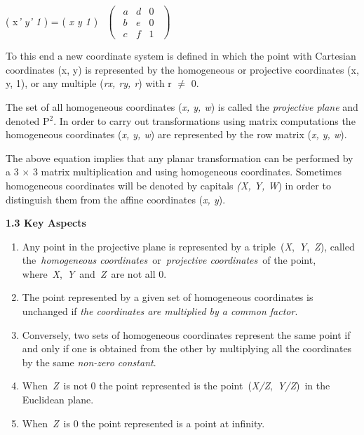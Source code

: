 \documentclass{article} %
\begin{document}
    ( x\textit{'  y'  1 })    =    ( \textit{x  y  1} )$\ \ \ \ \left( \begin{array}{ccc}
\ \ a & d & 0\ \  \\ 
\ \ b & e & 0\ \  \\ 
\ \ c & f & 1\ \  \end{array}
\right)$

\noindent 

\noindent To this end a new coordinate system is defined in which the point with Cartesian coordinates (x, y) is represented by the homogeneous or projective coordinates (x, y, 1), or any multiple (\textit{rx, ry, r}) with r $\mathrm{\neq}$ 0.

\noindent The set of all homogeneous coordinates (\textit{x, y, w}) is called the \textit{projective plane} and denoted P${}^{2}$. In order to carry out transformations using matrix computations the homogeneous coordinates (\textit{x, y, w}) are represented by the row matrix (\textit{x, y, w}). 

The above equation implies that any planar transformation can be performed by a 3 $\times$ 3 matrix multiplication and using homogeneous coordinates. Sometimes homogeneous coordinates will be denoted by capitals \textit{(X, Y, W}) in order to distinguish them from the affine coordinates (\textit{x, y}).



\noindent \textbf{1.3 Key Aspects}

\begin{enumerate}
\item \textbf{ }Any point in the projective plane is represented by a triple~(\textit{X},~\textit{Y},~\textit{Z}), called the~\textit{homogeneous coordinates}~or~\textit{projective coordinates}~of the point, where~\textit{X},~\textit{Y}~and~\textit{Z}~are not all 0.

\item  The point represented by a given set of homogeneous coordinates is unchanged if \textit{the coordinates are multiplied by a common factor}.

\item  Conversely, two sets of homogeneous coordinates represent the same point if and only if one is obtained from the other by multiplying all the coordinates by the same \textit{non-zero constant}.

\item  When~\textit{Z}~is not 0 the point represented is the point~(\textit{X/Z},~\textit{Y/Z})~in the Euclidean plane.

\item  When~\textit{Z}~is 0 the point represented is a point at infinity.
\end{enumerate}
\end{document}
